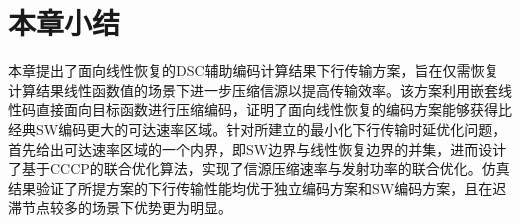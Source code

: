 %
%
%


\section{本章小结}\label{4.6}

本章提出了面向线性恢复的DSC辅助编码计算结果下行传输方案，旨在仅需恢复计算结果线性函数值的场景下进一步压缩信源以提高传输效率。该方案利用嵌套线性码直接面向目标函数进行压缩编码，证明了面向线性恢复的编码方案能够获得比经典SW编码更大的可达速率区域。针对所建立的最小化下行传输时延优化问题，首先给出可达速率区域的一个内界，即SW边界与线性恢复边界的并集，进而设计了基于CCCP的联合优化算法，实现了信源压缩速率与发射功率的联合优化。仿真结果验证了所提方案的下行传输性能均优于独立编码方案和SW编码方案，且在迟滞节点较多的场景下优势更为明显。